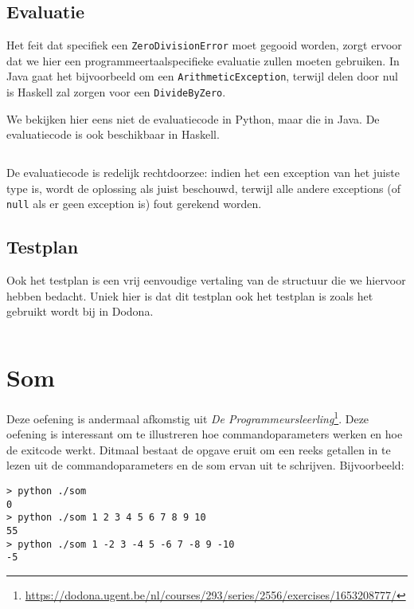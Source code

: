 \subsection{Evaluatie}\label{subsec:oefening-zero-evaluatie}

Het feit dat specifiek een \texttt{ZeroDivisionError} moet gegooid worden, zorgt ervoor dat we hier een programmeertaalspecifieke evaluatie zullen moeten gebruiken.
In Java gaat het bijvoorbeeld om een \texttt{ArithmeticException}, terwijl delen door nul is Haskell zal zorgen voor een \texttt{DivideByZero}.

We bekijken hier eens niet de evaluatiecode in Python, maar die in Java.
De evaluatiecode is ook beschikbaar in Haskell.

\inputminted{java}{sources/division-evaluator.java}

De evaluatiecode is redelijk rechtdoorzee: indien het een exception van het juiste type is, wordt de oplossing als juist beschouwd, terwijl alle andere exceptions (of \texttt{null} als er geen exception is) fout gerekend worden.

\subsection{Testplan}\label{subsec:oefening-zero-testplan}

Ook het testplan is een vrij eenvoudige vertaling van de structuur die we hiervoor hebben bedacht.
Uniek hier is dat dit testplan ook het testplan is zoals het gebruikt wordt bij in Dodona.

\inputminted{json}{sources/division-plan.tson}

\section{Som}\label{sec:oefeningen-som}

Deze oefening is andermaal afkomstig uit \emph{De Programmeursleerling}\footnote{\url{https://dodona.ugent.be/nl/courses/293/series/2556/exercises/1653208777/}}.
Deze oefening is interessant om te illustreren hoe commandoparameters werken en hoe de exitcode werkt.
Ditmaal bestaat de opgave eruit om een reeks getallen in te lezen uit de commandoparameters en de som ervan uit te schrijven.
Bijvoorbeeld:

\begin{verbatim}
> python ./som
0
> python ./som 1 2 3 4 5 6 7 8 9 10
55
> python ./som 1 -2 3 -4 5 -6 7 -8 9 -10
-5
\end{verbatim}

